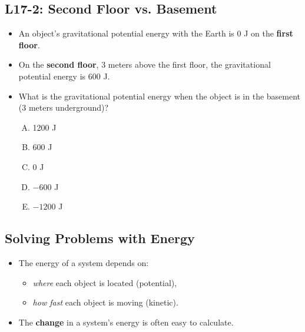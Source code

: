 \documentclass[]{article}
\newcommand{\Week}{17}
\begin{document}
\begin{PresentSpace}
\vspace{-10pt}
\section*{L\Week-2: Second Floor vs. Basement}
\vspace{-10pt}
\begin{itemize}
	\item An object's gravitational potential energy with the Earth is 0 J on the \textbf{first floor}.
	\item On the \textbf{second floor}, 3 meters above the first floor, the gravitational potential energy is 600 J.
	\item What is the gravitational potential energy when the object is in the basement (3 meters underground)?
	\begin{multicols}{5}
	\begin{enumerate}[(A)]
		\item 1200 J
		\item 600 J
		\item 0 J
		\item $-600$ J
		\item $-1200$ J
	\end{enumerate}
	\end{multicols}
\end{itemize}
\end{PresentSpace}
\newpage
\begin{TeacherMargin}

\end{TeacherMargin}
\begin{PresentSpace}
\vspace{-10pt}
\section*{Solving Problems with Energy}
\vspace{-10pt}
\begin{itemize}
	\item The energy of a system depends on:
	\begin{itemize}
		\item \textit{where} each object is located (potential),
		\item \textit{how fast} each object is moving (kinetic).
	\end{itemize}
	\item The \textbf{change} in a system's energy is often easy to calculate.
\end{itemize}
\end{PresentSpace}
\end{document}
